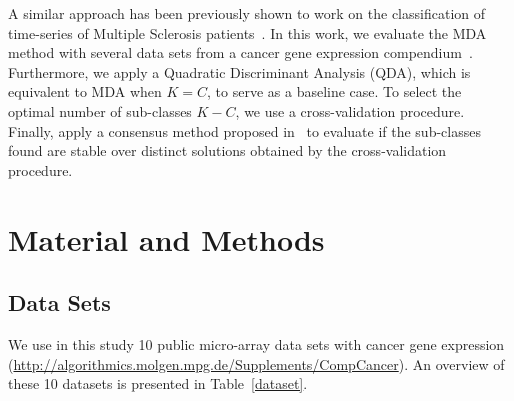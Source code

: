 \documentclass[runningheads,a4paper]{llncs}
\begin{document}
A similar approach has been previously shown to work on the
classification of time-series of Multiple Sclerosis
patients~\cite{Costa2009a}. In this work, we evaluate the MDA method
with several data sets from a cancer gene expression
compendium~\cite{Souto2008}. Furthermore, we apply a Quadratic
Discriminant Analysis (QDA), which is equivalent to MDA when $K=C$, to
serve as a baseline case.  To select the optimal number of sub-classes
$K-C$, we use a cross-validation procedure. Finally, apply a consensus
method proposed in~\cite{Monti2003} to evaluate if the sub-classes
found are stable over distinct solutions obtained by the
cross-validation procedure.


\section{Material and Methods}

\subsection{Data Sets}


We use in this study 10 public micro-array data sets with cancer gene
expression {\small
(\url{http://algorithmics.molgen.mpg.de/Supplements/CompCancer})}. An
overview of these 10 datasets is presented in Table~\ref{dataset}.
\end{document}
